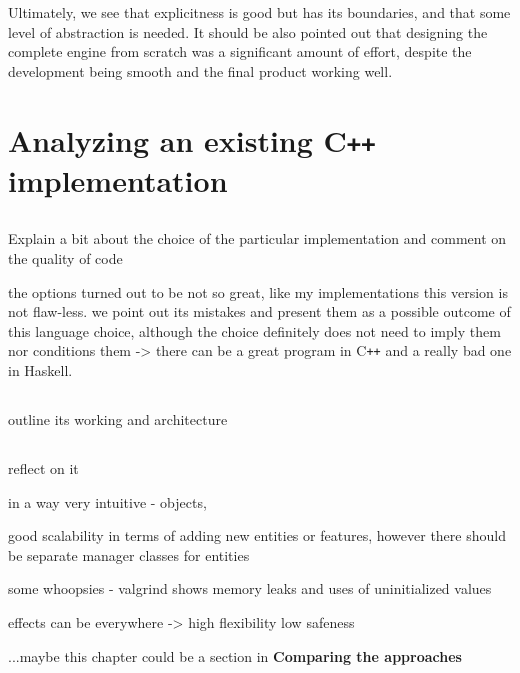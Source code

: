 \documentclass[
  digital, %
  color,   %
  table,   %
  oneside, %
  lof,     %
  lot,     %
]{fithesis3}
\newcommand{\cpp}{C\nolinebreak\texttt{+}\nolinebreak\texttt{+}}
\begin{document}
{Ultimately, we see that explicitness is good but has its boundaries,
and that some level of abstraction is needed. 
It should be also pointed out that designing the complete engine from scratch
was a significant amount of effort, despite the development being smooth and the final
product working well.





\chapter{Analyzing an existing \cpp{} implementation}

\section{}
Explain a bit about the choice of the particular implementation and
comment on the quality of code

the options turned out to be not so great, like my implementations
this version is not flaw-less. we point out its mistakes and present
them as a possible outcome of this language choice, although the choice
definitely does not need to imply them nor conditions them
-> there can be a great program in \cpp{} and a really bad one in Haskell.

\section{}
outline its working and architecture

\section{}
reflect on it

in a way very intuitive - objects, 

good scalability in terms of adding new entities or features,
however there should be separate manager classes for entities

some whoopsies - valgrind shows memory leaks and uses of uninitialized values

effects can be everywhere -> high flexibility low safeness

...maybe this chapter could be a section in \textbf{Comparing the approaches}




}
\end{document}

